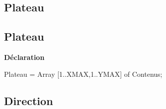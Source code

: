 \documentclass{report}
\newif\ifpdf
\begin{document}
\subsection*{\large{\textbf{Plateau}}\normalsize\hspace{1ex}\hrulefill}
\else
\subsection*{Plateau}
\fi
\label{Types-Plateau}
\begin{list}{}{
\setlength{\itemindent}{0cm}
\setlength{\listparindent}{0cm}
\setlength{\leftmargin}{\evensidemargin}
\addtolength{\leftmargin}{\tmplength}
\settowidth{\labelsep}{X}
\addtolength{\leftmargin}{\labelsep}
\setlength{\labelwidth}{\tmplength}
}
\item[\textbf{Déclaration}\hfill]
\ifpdf
\begin{flushleft}
\fi
\begin{ttfamily}
Plateau = Array [1..XMAX,1..YMAX] of Contenus;\end{ttfamily}

\ifpdf
\end{flushleft}
\fi

\end{list}
\ifpdf
\subsection*{\large{\textbf{Direction}}\normalsize\hspace{1ex}\hrulefill}
\else
\end{document}
